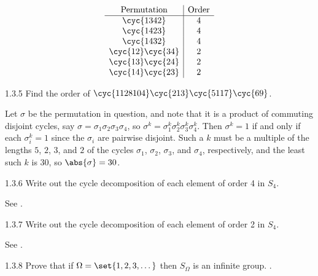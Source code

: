 \begin{solenum}
\[        \begin{array}{*{1}{c|}c}
            \text{Permutation} & \text{Order} \\
            \hline
            \cyc{1 3 4 2} & 4 \\
            \cyc{1 4 2 3} & 4 \\
            \cyc{1 4 3 2} & 4 \\
            \cyc{1 2}\cyc{3 4} & 2 \\
            \cyc{1 3}\cyc{2 4} & 2 \\
            \cyc{1 4}\cyc{2 3} & 2
        \end{array}
    \]
\end{solenum}

\begin{exercise}{1.3.5}
    Find the order of $\cyc{1 12 8 10 4}\cyc{2 13}\cyc{5 11 7}\cyc{6 9}$.
\end{exercise}

\begin{sol}
    Let $\sigma$ be the permutation in question, and note that it is a product of commuting disjoint cycles, say $\sigma = \sigma_1 \sigma_2 \sigma_3 \sigma_4$, so $\sigma^k = \sigma_1^k \sigma_2^k \sigma_3^k \sigma_4^k$.
    Then $\sigma^k = 1$ if and only if each $\sigma_i^k = 1$ since the $\sigma_i$ are pairwise disjoint.
    Such a $k$ must be a multiple of the lengths $5$, $2$, $3$, and $2$ of the cycles $\sigma_1$, $\sigma_2$, $\sigma_3$, and $\sigma_4$, respectively, and the least such $k$ is $30$, so $\abs{\sigma} = 30$.
\end{sol}

\begin{exercise}{1.3.6}
    Write out the cycle decomposition of each element of order 4 in $S_4$.
\end{exercise}

\begin{sol}
    See .
\end{sol}

\begin{exercise}{1.3.7}
    Write out the cycle decomposition of each element of order 2 in $S_4$.
\end{exercise}

\begin{sol}
    See .
\end{sol}

\begin{exercise}{1.3.8}
    Prove that if $\Omega = \set{1,2,3,\dots}$ then $S_\Omega$ is an infinite group.
    .
\end{exercise}

